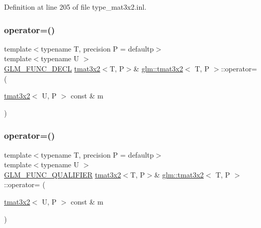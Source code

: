 Definition at line 205 of file type\+\_\+mat3x2.\+inl.

\mbox{\label{structglm_1_1tmat3x2_a5d7234f313530abc1c77413d15fa6882}} 
\subsubsection{\texorpdfstring{operator=()}{operator=()}\hspace{0.1cm}{\footnotesize\ttfamily [2/3]}}
{\footnotesize\ttfamily template$<$typename T, precision P = defaultp$>$ \\
template$<$typename U $>$ \\
\mbox{\hyperlink{setup_8hpp_ab2d052de21a70539923e9bcbf6e83a51}{G\+L\+M\+\_\+\+F\+U\+N\+C\+\_\+\+D\+E\+CL}} \mbox{\hyperlink{structglm_1_1tmat3x2}{tmat3x2}}$<$T, P$>$\& \mbox{\hyperlink{structglm_1_1tmat3x2}{glm\+::tmat3x2}}$<$ T, P $>$\+::operator= (\begin{DoxyParamCaption}\item[{\mbox{\hyperlink{structglm_1_1tmat3x2}{tmat3x2}}$<$ U, P $>$ const \&}]{m }\end{DoxyParamCaption})}

\mbox{\label{structglm_1_1tmat3x2_ac868522f7be6e78c28c6d00deb181060}} 
\subsubsection{\texorpdfstring{operator=()}{operator=()}\hspace{0.1cm}{\footnotesize\ttfamily [3/3]}}
{\footnotesize\ttfamily template$<$typename T, precision P = defaultp$>$ \\
template$<$typename U $>$ \\
\mbox{\hyperlink{setup_8hpp_a33fdea6f91c5f834105f7415e2a64407}{G\+L\+M\+\_\+\+F\+U\+N\+C\+\_\+\+Q\+U\+A\+L\+I\+F\+I\+ER}} \mbox{\hyperlink{structglm_1_1tmat3x2}{tmat3x2}}$<$T, P$>$\& \mbox{\hyperlink{structglm_1_1tmat3x2}{glm\+::tmat3x2}}$<$ T, P $>$\+::operator= (\begin{DoxyParamCaption}\item[{\mbox{\hyperlink{structglm_1_1tmat3x2}{tmat3x2}}$<$ U, P $>$ const \&}]{m }\end{DoxyParamCaption})}



